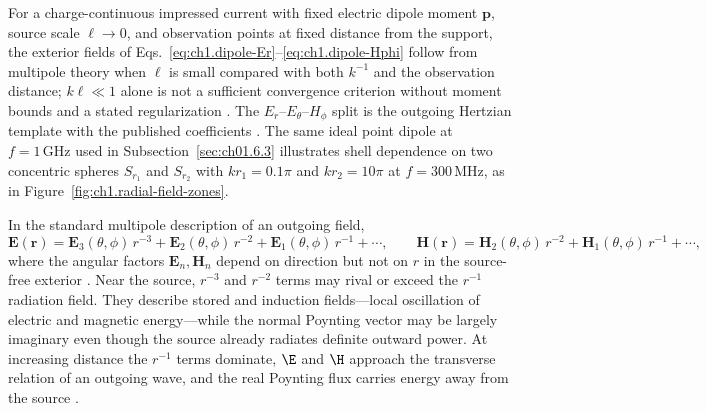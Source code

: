For a charge-continuous impressed current with fixed electric dipole moment $\mathbf{p}$, source scale $\ell\to 0$, and observation points at fixed distance from the support, the exterior fields of Eqs.~\eqref{eq:ch1.dipole-Er}--\eqref{eq:ch1.dipole-Hphi} follow from multipole theory when $\ell$ is small compared with both $k^{-1}$ and the observation distance; $k\ell\ll 1$ alone is not a sufficient convergence criterion without moment bounds and a stated regularization \cite{stratton1941,harrington2001,jackson1999,yaghjian1982}. The $E_r$--$E_\theta$--$H_\phi$ split is the outgoing Hertzian template with the published coefficients \cite{stratton1941,harrington2001}. The same ideal point dipole at
$f=1\,\mathrm{GHz}$ used in Subsection~\ref{sec:ch01.6.3} illustrates shell dependence on
two concentric spheres $S_{r_1}$ and $S_{r_2}$ with $kr_1=0.1\pi$ and $kr_2=10\pi$ at $f=300\,\mathrm{MHz}$, as in Figure~\ref{fig:ch1.radial-field-zones}.

In the standard multipole description of an outgoing field,
\begin{equation}
\label{eq:ch1.ex64-multipole-radial}
\mathbf{E}(\mathbf{r})=\mathbf{E}_3(\theta,\phi)\,r^{-3}+\mathbf{E}_2(\theta,\phi)\,r^{-2}+\mathbf{E}_1(\theta,\phi)\,r^{-1}+\cdots,
\qquad
\mathbf{H}(\mathbf{r})=\mathbf{H}_2(\theta,\phi)\,r^{-2}+\mathbf{H}_1(\theta,\phi)\,r^{-1}+\cdots,
\end{equation}
where the angular factors $\mathbf{E}_n,\mathbf{H}_n$ depend on direction but not on $r$ in the source-free exterior \cite{stratton1941}. Near the source, $r^{-3}$ and $r^{-2}$ terms may rival or exceed the $r^{-1}$ radiation field. They describe stored and induction fields—local oscillation of electric and magnetic energy—while the normal Poynting vector may be largely imaginary even though the source already radiates definite outward power. At increasing distance the $r^{-1}$ terms dominate, $\E$ and $\H$ approach the transverse relation of an outgoing wave, and the real Poynting flux carries energy away from the source \cite{poynting1884}.


